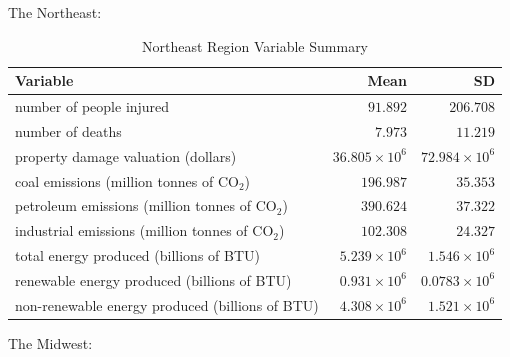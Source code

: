 \documentclass[10pt,]{article}
\begin{document}
The Northeast:

\begin{center}
  \begin{table}[h]
  \caption{\label{tab:table-name}Northeast Region Variable Summary}
  \smallskip
  \begin{center}
  \begin{tabular}{|l r r|}
  \hline
  Variable & Mean & SD \\ [0.5ex] 
  \hline\hline
  number of people injured & $91.892$ & $206.708$ \\ 
  \hline
  number of deaths & $7.973$ & $11.219$ \\
  \hline
  property damage valuation (dollars) & $36.805 \times 10^6$ & $72.984 \times 10^6$ \\
  \hline
  coal emissions (million tonnes of CO$_2$) & $196.987$ & $35.353$ \\
  \hline
  petroleum emissions (million tonnes of CO$_2$) & $390.624$ & $37.322$ \\
  \hline
  industrial emissions (million tonnes of CO$_2$) & $102.308$ & $24.327$ \\ 
  \hline
  total energy produced (billions of BTU) & $5.239 \times 10^6$ & $1.546 \times 10^6$ \\
  \hline
  renewable energy produced (billions of BTU) & $0.931 \times 10^6$ & $0.0783 \times 10^6$ \\
  \hline
  non-renewable energy produced (billions of BTU) & $4.308 \times 10^6$ & $1.521 \times 10^6$ \\
  \hline
  \end{tabular}
  \end{center}
  \end{table}
\end{center}

The Midwest:
\end{document}
